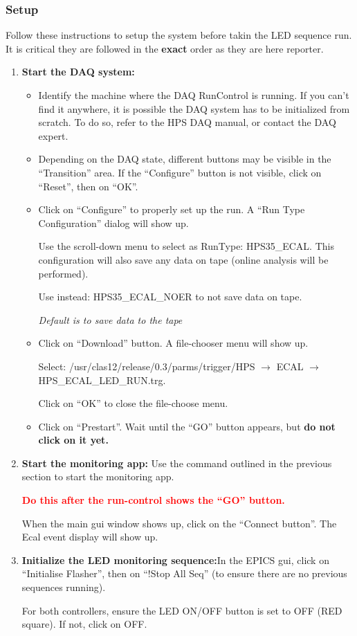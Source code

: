 \documentclass[12pt]{article}
\begin{document}
\subsubsection{Setup}
Follow these instructions to setup the system before takin the LED sequence run.
It is critical they are followed in the \textbf{exact} order as they are here reporter.

\begin{enumerate}
\item{\textbf{Start the DAQ system: }
\begin{itemize}
\item Identify the machine where the DAQ RunControl is running. If you can't find it anywhere, it is possible the DAQ system has to be initialized from scratch. To do so, refer to the HPS DAQ manual, or contact the DAQ expert.
\item Depending on the DAQ state, different buttons may be visible in the ``Transition'' area. If the ``Configure'' button is not visible, click on ``Reset'', then on ``OK''.
\item Click on ``Configure'' to properly set up the run.
A ``Run Type Configuration'' dialog will show up.

Use the scroll-down menu to select as RunType: HPS35\_ECAL. This configuration will also save any data on tape (online analysis will be performed).

Use instead: HPS35\_ECAL\_NOER to not save data on tape.

\textit{Default is to save data to the tape}
\item{Click on ``Download'' button. A file-chooser menu will show up.

Select: /usr/clas12/release/0.3/parms/trigger/HPS $\rightarrow$ ECAL $\rightarrow$  HPS\_ECAL\_LED\_RUN.trg. 

Click on ``OK'' to close the file-choose menu.
}
\item{Click on ``Prestart''.  Wait until the ``GO'' button appears, but {\bf do not click on it yet.}

 }
\end{itemize}
}
\item{\textbf{Start the monitoring app: }Use the command outlined in the previous section to start the monitoring app.

\textcolor{red}{\bf Do this after the run-control shows the ``GO'' button.}

When the main gui window shows up, click on the ``Connect button''. The Ecal event display will show up.}
\item{\textbf{Initialize the LED monitoring sequence:}In the EPICS gui, click on ``Initialise Flasher'', then on ``!Stop All Seq'' (to ensure there are no previous sequences running). 

For both controllers, ensure the LED ON/OFF button is set to OFF (RED square). If not, click on OFF.}
\end{enumerate}
      
\end{document}
